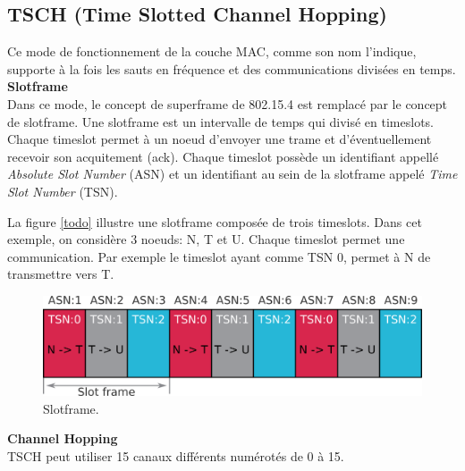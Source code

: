 \subsection{TSCH (Time Slotted Channel Hopping)}\label{subsec:etat_art-802.15.4.tsch}

Ce mode de fonctionnement de la couche MAC, comme son nom l'indique, supporte à la fois les sauts en fréquence et des communications divisées en temps.\\

\textbf{Slotframe}\\
Dans ce mode, le concept de superframe de 802.15.4 est remplacé par le concept de slotframe.
Une slotframe est un intervalle de temps qui divisé en timeslots. Chaque timeslot permet à un noeud d'envoyer une trame et d'éventuellement recevoir son acquitement (ack).
Chaque timeslot possède un identifiant appellé \textit{Absolute Slot Number} (ASN)
et un identifiant au sein de la slotframe appelé \textit{Time Slot Number} (TSN).

La figure \ref{todo} illustre une slotframe composée de trois timeslots.
Dans cet exemple, on considère 3 noeuds: N, T et U. Chaque timeslot permet une communication.
Par exemple le timeslot ayant comme TSN 0, permet à N de transmettre vers T.

\begin{figure}[H]
  \centering
  \includegraphics[scale=0.7]{res/pictures/sloframe.png}
  \caption{Slotframe.}
  \label{fig:state-slotframe}
\end{figure}

\textbf{Channel Hopping}\\

TSCH peut utiliser 15 canaux différents numérotés de 0 à 15.
